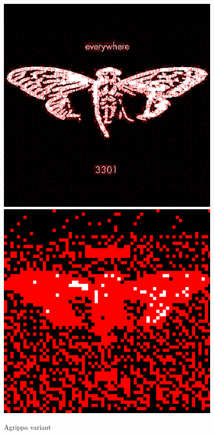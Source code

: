 \documentclass{article}
\begin{document}
\begin{figure}[h]
	\centering
	
	\includegraphics[scale=0.3]{agrippa_data_coefficients}
	\includegraphics[scale=0.3]{agrippa_data_blocks}
	
	\caption{Agrippa variant}
\end{figure}
\end{document}
